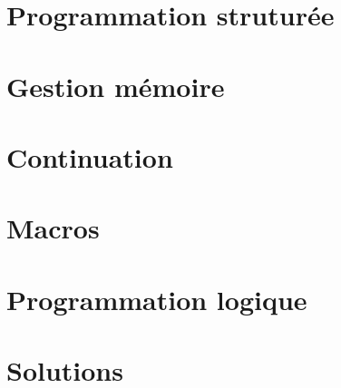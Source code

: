 \documentclass[10pt]{scrreprt}
\begin{document}




\chapter{Programmation struturée}



\chapter{Gestion mémoire}









\chapter{Continuation}


\chapter{Macros}














\chapter{Programmation logique}














\chapter{Solutions}
\shipoutAnswer
\end{document}
